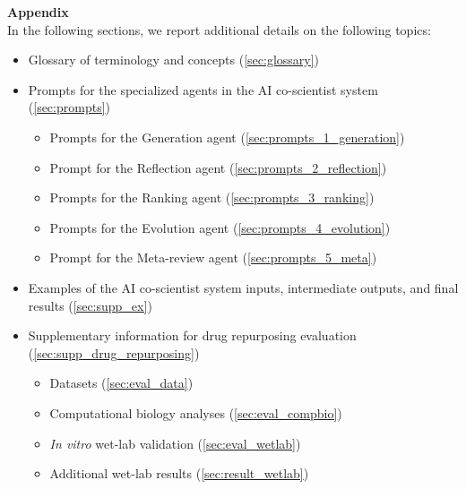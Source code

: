 
\clearpage


\renewcommand{\thesection}{A.\arabic{section}}
\renewcommand{\thefigure}{A.\arabic{figure}}
\renewcommand{\thetable}{A.\arabic{table}} 
\renewcommand{\theequation}{A.\arabic{equation}} 
\renewcommand{\theHsection}{A\arabic{section}}

\setcounter{section}{0}
\setcounter{figure}{0}
\setcounter{table}{0}
\setcounter{equation}{0}


\noindent \textbf{\LARGE{Appendix}}\\


In the following sections, we report additional details on the following topics:
\begin{itemize}[leftmargin=1.5em,rightmargin=0em]
    \item Glossary of terminology and concepts (\cref{sec:glossary})
    \item Prompts for the specialized agents in the AI co-scientist system (\cref{sec:prompts})
    \begin{itemize}
        \item Prompts for the Generation agent (\cref{sec:prompts_1_generation})
        \item Prompt for the Reflection agent (\cref{sec:prompts_2_reflection})
        \item Prompts for the Ranking agent (\cref{sec:prompts_3_ranking})
        \item Prompts for the Evolution agent (\cref{sec:prompts_4_evolution})
        \item Prompt for the Meta-review agent (\cref{sec:prompts_5_meta})
    \end{itemize}
    \item Examples of the AI co-scientist system inputs, intermediate outputs, and final results (\cref{sec:supp_ex})
    \item Supplementary information for drug repurposing evaluation (\cref{sec:supp_drug_repurposing})
    \begin{itemize}
        \item Datasets (\cref{sec:eval_data})
        \item Computational biology analyses (\cref{sec:eval_compbio})
        \item \textit{In vitro} wet-lab validation (\cref{sec:eval_wetlab})
        \item Additional wet-lab results (\cref{sec:result_wetlab})
    \end{itemize}

\end{itemize}
